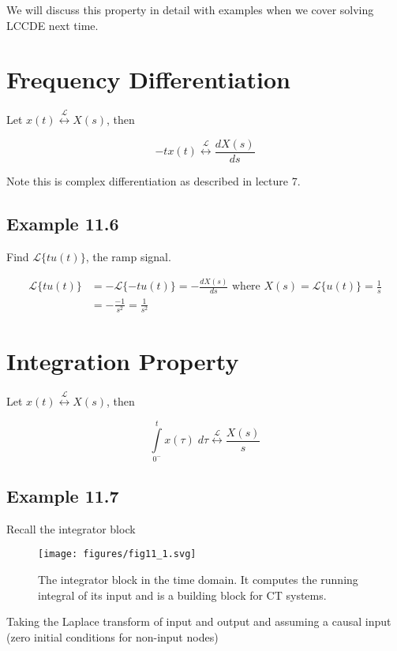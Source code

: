 \documentclass{article}
\begin{document}
We will discuss this property in detail with examples when we cover solving LCCDE next time.

\section{Frequency Differentiation}

Let $x(t) \stackrel{\mathcal{L}}{\longleftrightarrow} X(s)$, then 


$$
-t x(t) \stackrel{\mathcal{L}}{\longleftrightarrow} \frac{d X(s)}{d s}
$$

Note this is complex differentiation as described in lecture 7.

\subsection{Example 11.6}

Find $\mathcal{L}\{t u(t)\}$, the ramp signal.

$$
\begin{aligned}
\mathcal{L}\{t u(t)\} & =-\mathcal{L}\{-t u(t)\}=-\frac{d X(s)}{d s} \text { where } X(s) =\mathcal{L}\{u(t)\} =\frac{1}{s}\\
& =-\frac{-1}{s^{2}}=\frac{1}{s^{2}}
\end{aligned}
$$

\section{Integration Property}

Let $x(t) \stackrel{\mathcal{L}}{\longleftrightarrow} X(s)$, then 

$$
\int\limits_{0^-}^t  x(\tau) \; d\tau \stackrel{\mathcal{L}}{\longleftrightarrow} \frac{X(s)}{s}
$$

\subsection{Example 11.7}

Recall the integrator block

\begin{figure}
  \centering
  \texttt{[image: figures/fig11\_1.svg]}
  \caption{The integrator block in the time domain. It computes the running integral of its input and is a building block for CT systems.}
\end{figure}

Taking the Laplace transform of input and output and assuming a causal input (zero initial conditions for non-input nodes)
\end{document}
